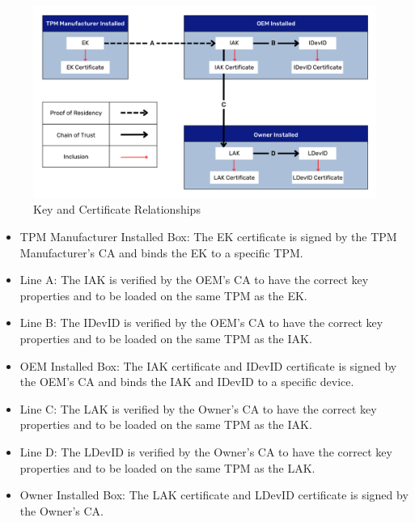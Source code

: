 \documentclass[runningheads]{llncs}
\begin{document}
\begin{figure}[h]
  \begin{centering}
  \includegraphics[width=\linewidth]{figures/certRelationships.png}
  \par\end{centering}
  \caption{Key and Certificate Relationships \citep{DevIDSpec-TCG}}
  \label{fig:cert_rel}
\end{figure}
\vspace{2em}
\begin{itemize}[itemsep=0pt,parsep=0pt,partopsep=0pt]
  \item \textsf{TPM Manufacturer Installed Box}: The EK certificate is signed by the TPM Manufacturer's CA and binds the EK to a specific TPM.
  \item \textsf{Line A}: The IAK is verified by the OEM's CA to have the correct key properties and to be loaded on the same TPM as the EK.
  \item \textsf{Line B}: The IDevID is verified by the OEM's CA to have the correct key properties and to be loaded on the same TPM as the IAK.
  \item \textsf{OEM Installed Box}: The IAK certificate and IDevID certificate is signed by the OEM's CA and binds the IAK and IDevID to a specific device.
  \item \textsf{Line C}: The LAK is verified by the Owner's CA to have the correct key properties and to be loaded on the same TPM as the IAK.
  \item \textsf{Line D}: The LDevID is verified by the Owner's CA to have the correct key properties and to be loaded on the same TPM as the LAK.
  \item \textsf{Owner Installed Box}: The LAK certificate and LDevID certificate is signed by the Owner's CA.
\end{itemize}
\end{document}
